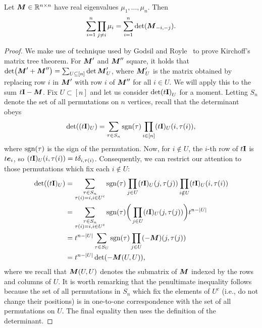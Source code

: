\begin{lemma}
	\label{lem:cofactors_technical}
	Let  ${\vb*{M}}\in\mathbb{R}^{n\times n}$ have real eigenvalues $\mu_1,\dots,\mu_n$. Then 
	\begin{equation}
	\label{eq:cofactors_technical}
	\sum_{i=1}^n \prod_{j\neq i}\mu_i = \sum_{i=1}^n  \det({\vb*{M}}_{-i,-j}).
	\end{equation}
\end{lemma}
\begin{proof}
We make use of technique used by Godsil and Royle~\cite{godsil2013algebraic} to prove Kirchoff's matrix  tree theorem. For ${\vb*{M}}'$ and  ${\vb*{M}}''$  square, it  holds that $\det(\M'+\M'') = \sum_{U\subset[n]} \det \M'_U$, where  ${\vb*{M}}'_U$ is the matrix obtained by replacing row $i$  in ${\vb*{M}}'$ with row   $i$ of ${\vb*{M}}''$  for  all $i\in U$. We will apply  this to the sum $t\vb{I}-{\vb*{M}}$. Fix $U\subset[n]$ and  let  us consider $\det(t\vb{I})_U$ for a moment. Letting $S_n$ denote the set of all permutations on $n$ vertices,  recall  that the determinant obeys  
\begin{equation*}
\det((t\vb{I})_U) = \sum_{\tau\in S_n}\textnormal{sgn}(\tau)\prod_{i\in[n]}(t\vb{I})_U(i,\tau(i)),
\end{equation*}
where $\textnormal{sgn}(\tau)$ is the  sign  of the permutation. Now,  for  $i\notin  U$, the $i$-th row of $t\vb{I}$ is $t\vb*{e}_i$, so $(t\vb{I})_U(i,\tau(i)) = t\delta_{i,\tau(i)}$. Consequently, we can restrict  our attention to those permutations which fix each $i\notin U$: 
\begin{align*}
\det((t\I)_U) &= \sum_{\substack{\tau \in S_n\\\tau(i)=i,i\in U^c}} \sgn(\tau) \prod_{j\in U} (t\I)_U(j,\tau(j))\prod_{i\notin U}(t\I)_U(i,\tau(i)) \\
&=  \sum_{\substack{\tau \in S_n\\\tau(i)=i,i\in U^c}} \sgn(\tau) \bigg(\prod_{j\in U} (t\I)_U(j,\tau(j))\bigg)t^{n-|U|} \\
&= t^{n-|U|}\sum_{\tau \in S_{U}} \sgn(\tau) \prod_{j\in U} (-\M)(j,\tau(j)) \\
&= t^{n-|U|} \det(-\M(U,U)),  %
\end{align*}
where we recall that ${\vb*{M}}(U,U)$ denotes the submatrix of ${\vb*{M}}$ indexed by the rows and columns of  $U$. It is worth remarking that the penultimate inequality follows because the  set of all permutations in $S_n$ which fix the elements of $U^c$ (i.e.,  do  not  change their positions) is in  one-to-one correspondence with the set of all permutations on $U$. The final equality then  uses the definition of the determinant. 

\end{proof}

